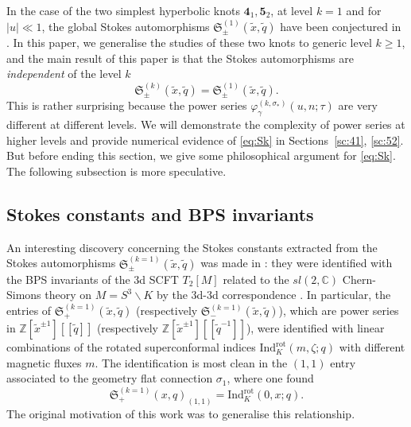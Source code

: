 \documentclass[a4paper,11pt]{article}	%
\def\md{\mathbf}
\def\mf{\mathfrak}
\def\IC{\mathbb{C}}
\def\IZ{\mathbb{Z}}
\def\tq{\tilde{q}}
\def\tx{\tilde{x}}
\newcommand{\s}{\sigma}
\newcommand{\knot}[1]{\md{#1}}
\def\jjj#1{$\spadesuit\spadesuit$ \emph{\textcolor{red}{#1}}
  $\spadesuit\spadesuit$}
\begin{document}
In the case of the two simplest hyperbolic knots
$\knot{4}_1, \knot{5}_2$, at level $k=1$ and for $|u|\ll 1$, the
global Stokes automorphisms $\mf{S}^{(1)}_{\pm}(\tx,\tq)$ have been
conjectured in \cite{Garoufalidis:2020xec,Garoufalidis:2020nut}.  In
this paper, we generalise the studies of these two knots to generic
level $k\geq 1$, and the main result of this paper is that the Stokes
automorphisms are \emph{independent} of the level $k$
\begin{equation}
  \mf{S}^{(k)}_{\pm}(\tx,\tq) = \mf{S}^{(1)}_{\pm}(\tx,\tq).
  \label{eq:Sk}
\end{equation}
This is rather surprising because the power series
$\varphi_{\gamma}^{(k,\s_*)}(u,n;\tau)$ are very different at
different levels.  We will demonstrate the complexity of power series
at higher levels and provide numerical evidence of \eqref{eq:Sk} in
Sections~\ref{sc:41}, \ref{sc:52}.  But before ending this section, we
give some philosophical argument for \eqref{eq:Sk}.  The following
subsection is more speculative.


\subsection{Stokes constants and BPS invariants}

An interesting discovery concerning the Stokes constants extracted
from the Stokes automorphisms $\mf{S}_{\pm}^{(k=1)}(\tx,\tq)$ was made
in \cite{Garoufalidis:2020xec,Garoufalidis:2020nut}: they were
identified with the BPS invariants of the 3d SCFT $T_2[M]$ related to
the $sl(2,\IC)$ Chern-Simons theory on $M= S^3\backslash K$ by the
3d-3d correspondence \cite{Dimofte:2011ju}.  In particular, the
entries of $\mf{S}_{+}^{(k=1)}(\tx,\tq)$ (respectively
$\mf{S}_{-}^{(k=1)}(\tx,\tq)$), which are power series in
$\IZ[\tx^{\pm 1}][[\tq]]$ (respectively
$\IZ[\tx^{\pm 1}][[\tq^{-1}]]$), were identified with linear
combinations of the rotated superconformal indices
$\text{Ind}_K^{\text{rot}}(m,\zeta;q)$
\cite{Dimofte:2011py,Beem:2012mb} with different magnetic fluxes $m$.
The identification is most clean in the $(1,1)$ entry associated to
the geometry flat connection $\s_1$, where one found
\begin{equation}
  \mf{S}_{+}^{(k=1)}(x,q)_{(1,1)} = \text{Ind}_K^{\text{rot}}(0,x;q).
  \label{eq:SInd}
\end{equation}
The original motivation of this work was to generalise this
relationship.
\end{document}
